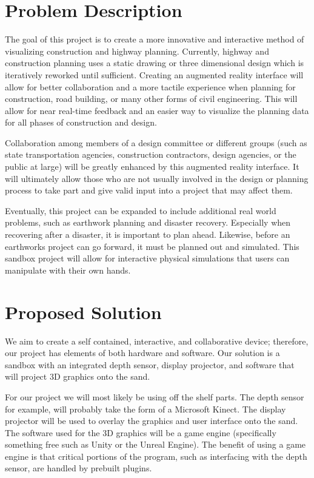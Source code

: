 \documentclass[onecolumn, draftclsnofoot,10pt, compsoc]{IEEEtran}
\begin{document}
\section{Problem Description}
The goal of this project is to create a more innovative and interactive method of visualizing construction and highway planning.
Currently, highway and construction planning uses a static drawing or three dimensional design which is iteratively reworked until sufficient.
Creating an augmented reality interface will allow for better collaboration and a more tactile experience when planning for construction, road building, or many other forms of civil engineering.
This will allow for near real-time feedback and an easier way to visualize the planning data for all phases of construction and design.
\par
Collaboration among members of a design committee or different groups (such as state transportation agencies, construction contractors, design agencies, or the public at large) will be greatly enhanced by this augmented reality interface.
It will ultimately allow those who are not usually involved in the design or planning process to take part and give valid input into a project that may affect them.
\par
Eventually, this project can be expanded to include additional real world  problems, such as earthwork planning and disaster recovery.
Especially when recovering after a disaster, it is important to plan ahead. Likewise, before an earthworks project can go forward, it must be planned out and simulated.
This sandbox project will allow for interactive physical simulations that users can manipulate with their own hands.

\section{Proposed Solution}
We aim to create a self contained, interactive, and collaborative device; therefore, our project has elements of both hardware and software.
Our solution is a sandbox with an integrated depth sensor, display projector, and software that will project 3D graphics onto the sand.
\par
For our project we will most likely be using off the shelf parts.
The depth sensor for example, will probably take the form of a Microsoft Kinect.
The display projector will be used to overlay the graphics and user interface onto the sand.
The software used for the 3D graphics will be a game engine (specifically something free such as Unity or the Unreal Engine).
The benefit of using a game engine is that critical portions of the program, such as interfacing with the depth sensor, are handled by prebuilt plugins.
\end{document}
